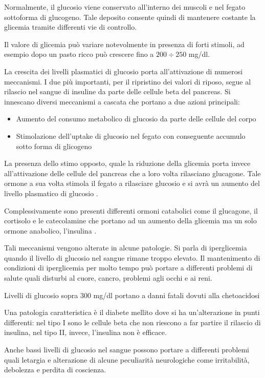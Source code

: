 Normalmente, il glucosio viene conservato all'interno dei muscoli e nel fegato sottoforma di glucogeno. Tale deposito consente quindi di mantenere costante la glicemia tramite differenti vie di controllo.

Il valore di glicemia può variare notevolmente in presenza di forti stimoli, ad esempio dopo un pasto ricco può crescere fino a $200\div 250$ mg/dl.

La crescita dei livelli plasmatici di glucosio porta all'attivazione di numerosi meccanismi. I due più importanti, per il ripristino dei valori di riposo, segue al rilascio nel sangue di insuline da parte delle cellule beta del pancreas. Si innescano diversi meccanismi a cascata che portano a due azioni principali:
\begin{itemize}
	\item Aumento del consumo metabolico di glucosio da parte delle cellule del corpo
	\item Stimolazione dell'uptake di glucosio nel fegato con conseguente accumulo sotto forma di glicogeno
\end{itemize}

La presenza dello stimo opposto, quale la riduzione della glicemia porta invece all'attivazione delle cellule del pancreas che a loro volta rilasciano glucagone. Tale ormone a sua volta stimola il fegato a rilasciare glucosio e si avrà un aumento del livello plasmatico di glucosio \cite{sherwood_fisiologia_2008}.

Complessivamente sono presenti differenti ormoni catabolici come il glucagone, il cortisolo e le catecolamine che portano ad un aumento della glicemia ma un solo ormone anabolico, l'insulina \cite{nelson_lehninger_2021}.

Tali meccanismi vengono alterate in alcune patologie. 
Si parla di iperglicemia quando il livello di glucosio nel sangue rimane troppo elevato. Il mantenimento di condizioni di iperglicemia per molto tempo può portare a differenti problemi di salute quali disturbi al cuore, cancro, problemi agli occhi e ai reni. 

Livelli di glucosio sopra 300 mg/dl portano a danni fatali dovuti alla chetoacidosi

Una patologia caratteristica è il diabete mellito dove si ha un'alterazione in punti differenti: nel tipo I sono le cellule beta che non riescono a far partire il rilascio di insulina, nel tipo II, invece, l'insulina non è efficace.

Anche bassi livelli di glucosio nel sangue possono portare a differenti problemi quali letargia e alterazione di alcune peculiarità neurologiche come irritabilità, debolezza e perdita di coscienza.

